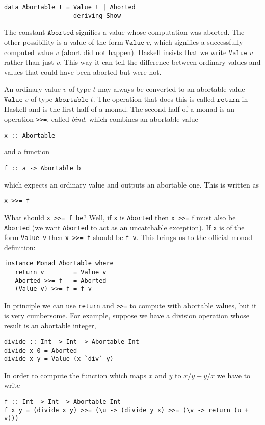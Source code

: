 \documentclass[a4paper,10pt]{article}
\newcommand{\cc}[1]{\lstinline{#1}}
\begin{document}
\begin{lstlisting}
data Abortable t = Value t | Aborted
                   deriving Show  
\end{lstlisting}
% 
The constant $\mathtt{Aborted}$ signifies a value whose computation was
aborted. The other possibility is a value of the form $\mathtt{Value}\;v$,
which signifies a successfully computed value $v$ (abort did not happen).
Haskell insists that we write $\mathtt{Value}\;v$ rather than just $v$. This
way it can tell the difference between ordinary values and values that could
have been aborted but were not.

An ordinary value $v$ of type $t$ may always be converted to an abortable
value $\mathtt{Value}\;v$ of type $\mathtt{Abortable}\;t$. The operation that
does this is called $\mathtt{return}$ in Haskell and is the first half of a
monad. The second half of a monad is an operation \cc{>>=}, called
\emph{bind}, which combines an abortable value
% 
\begin{lstlisting}
x :: Abortable
\end{lstlisting}
% 
and a function
\begin{lstlisting}
f :: a -> Abortable b  
\end{lstlisting}
% 
which expects an ordinary value and outputs an abortable one. This is written
as
% 
\begin{lstlisting}
x >>= f
\end{lstlisting}
% 
What should \cc{x >>= f be}? Well, if \cc{x} is \cc{Aborted} then \cc{x >>=} f
must also be \cc{Aborted} (we want \cc{Aborted} to act as an uncatchable
exception). If \cc{x} is of the form \cc{Value v} then \cc{x >>= f} should be
\cc{f v}. This brings us to the official monad definition:
% 
\begin{lstlisting}
instance Monad Abortable where
   return v        = Value v
   Aborted >>= f   = Aborted
   (Value v) >>= f = f v
\end{lstlisting}
% 
In principle we can use \cc{return} and \cc{>>=} to compute with abortable
values, but it is very cumbersome. For example, suppose we have a division
operation whose result is an abortable integer,
% 
\begin{lstlisting}
divide :: Int -> Int -> Abortable Int
divide x 0 = Aborted
divide x y = Value (x `div` y)  
\end{lstlisting}
% 
In order to compute the function which maps $x$ and $y$ to $x/y + y/x$ we have
to write
% 
\begin{lstlisting}
f :: Int -> Int -> Abortable Int
f x y = (divide x y) >>= (\u -> (divide y x) >>= (\v -> return (u + v)))
\end{lstlisting}
\end{document}
